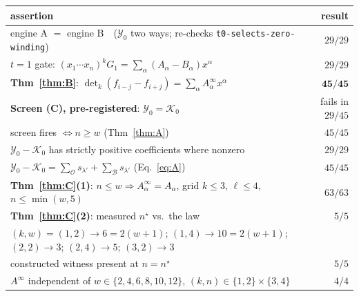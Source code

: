 \documentclass[11pt]{article}
\theoremstyle{plain}
\theoremstyle{definition}
\begin{document}
\begin{center}\small
\begin{tabular}{@{}lr@{}}
\toprule
assertion & result \\
\midrule
engine A $=$ engine B\ \ ($\mathcal Y_0$ two ways; re-checks \texttt{t0-selects-zero-winding}) & $29/29$\\
$t=1$ gate: $(x_1\cdots x_n)^kG_1=\sum_\alpha(A_\alpha-B_\alpha)x^\alpha$ & $29/29$\\
\textbf{Thm~\ref{thm:B}}: $\det_k(f_{i-j}-f_{i+j})=\sum_\alpha A^\infty_\alpha x^\alpha$ & $\mathbf{45/45}$\\
\midrule
\textbf{Screen (C), pre-registered}: $\mathcal Y_0=\mathcal K_0$ & fails in $29/45$\\
\quad screen fires $\iff n\ge w$ (Thm~\ref{thm:A}) & $45/45$\\
\quad $\mathcal Y_0-\mathcal K_0$ has strictly positive coefficients where nonzero & $29/29$\\
\quad $\mathcal Y_0-\mathcal K_0=\sum_{\mathcal O}s_{\lambda'}+\sum_{\mathcal B}s_{\lambda'}$ (Eq.~\eqref{eq:A}) & $45/45$\\
\midrule
\textbf{Thm~\ref{thm:C}(1)}: $n\le w\Rightarrow A^\infty_\alpha=A_\alpha$, grid $k\le3$, $\ell\le4$, $n\le\min(w,5)$ & $63/63$\\
\textbf{Thm~\ref{thm:C}(2)}: measured $n^\star$ vs.\ the law & $5/5$\\
\quad\quad $(k,w)=(1,2)\to6=2(w{+}1)$; $(1,4)\to10=2(w{+}1)$; $(2,2)\to3$; $(2,4)\to5$; $(3,2)\to3$ &\\
\quad constructed witness present at $n=n^\star$ & $5/5$\\
$A^\infty$ independent of $w\in\{2,4,6,8,10,12\}$, $(k,n)\in\{1,2\}\times\{3,4\}$ & $4/4$\\
\bottomrule
\end{tabular}
\end{center}
\end{document}
